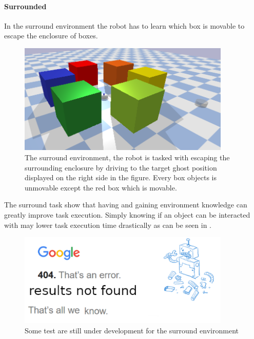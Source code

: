
\paragraph{Surrounded} In the surround environment the robot has to learn which box is movable to escape the enclosure of boxes.\bs
\begin{figure}[H]
    \centering
    \includegraphics[width=0.9\textwidth]{figures/tests/surrounded}
    \caption{The surround environment, the robot is tasked with escaping the surrounding enclosure by driving to the target ghost position displayed on the right side in the figure. Every box objects is unmovable except the red box which is movable.}%
    \label{fig:benchmark_surround}
\end{figure}
The surround task show that having and gaining environment knowledge can greatly improve task execution. Simply knowing if an object can be interacted with may lower task execution time drastically as can be seen in .\bs

\begin{figure}[H]
    \centering
    \includegraphics[width=0.9\textwidth]{figures/tests/404_not_found}
    \caption{Some test are still under development for the surround environment}%
    \label{fig:results_surround}
\end{figure}

